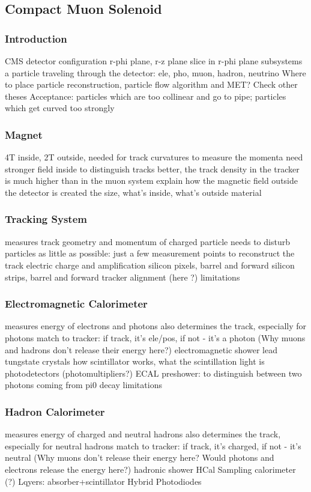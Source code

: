 \subsection{Compact Muon Solenoid}
\label{sec:Exp_CMS}
\subsubsection{Introduction}

CMS detector configuration
r-phi plane, r-z plane
slice in r-phi plane
subsystems
a particle traveling through the detector:
ele, pho, muon, hadron, neutrino
Where to place particle reconstruction, particle flow algorithm and MET? Check other theses
Acceptance: particles which are too collinear and go to pipe; particles which get curved too strongly

\subsubsection{Magnet}
4T inside, 2T outside, needed for track curvatures to measure the momenta
need stronger field inside to distinguish tracks better, the track density in the tracker is much higher than in the muon system
explain how the magnetic field outside the detector is created
the size, what's inside, what's outside
material

\subsubsection{Tracking System}
measures track geometry and momentum of charged particle
needs to disturb particles as little as possible: just a few measurement points to reconstruct the track
electric charge and amplification
silicon pixels, barrel and forward
silicon strips, barrel and forward
tracker alignment (here ?)
limitations

\subsubsection{Electromagnetic Calorimeter}
measures energy of electrons and photons
also determines the track, especially for photons
match to tracker: if track, it's ele/pos, if not - it's a photon
(Why muons and hadrons don't release their energy here?)
electromagnetic shower
lead tungstate crystals
how scintillator works, what the scintillation light is
photodetectors (photomultipliers?)
ECAL preshower: to distinguish between two photons coming from pi0 decay
limitations

\subsubsection{Hadron Calorimeter}
measures energy of charged and neutral hadrons
also determines the track, especially for neutral hadrons
match to tracker: if track, it's charged, if not - it's neutral
(Why muons don't release their energy here? Would photons and electrons release the energy here?)
hadronic shower
HCal Sampling calorimeter (?)
Lqyers: absorber+scintillator
Hybrid Photodiodes


